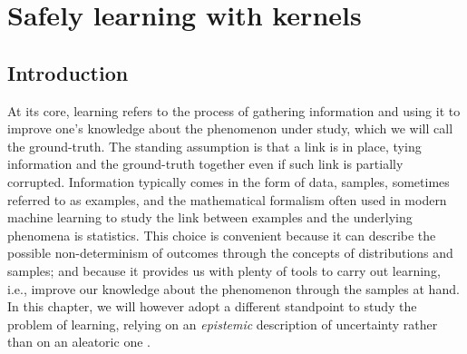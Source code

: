 \cleardoublepage
\chapter{Safely learning with kernels}

\section{Introduction}
At its core, learning refers to the process of gathering information and using it to improve one's knowledge about the phenomenon under study, which we will call the ground-truth. The standing assumption is that a link is in place, tying information and the ground-truth together even if such link is partially corrupted. Information typically comes in the form of data, samples, sometimes referred to as examples, and
the mathematical formalism often used in modern machine learning to study the link between examples and the underlying phenomena is statistics. This choice is convenient because it can describe the possible non-determinism of outcomes through the concepts of distributions and samples; and because it provides us with plenty of tools to carry out learning, i.e., improve our knowledge about the phenomenon through the samples at hand. In this chapter, we will however adopt a different standpoint to study the problem of learning, relying on an \textit{epistemic} description of uncertainty rather than on an aleatoric one \citep{hullermeier2021aleatoric}.

